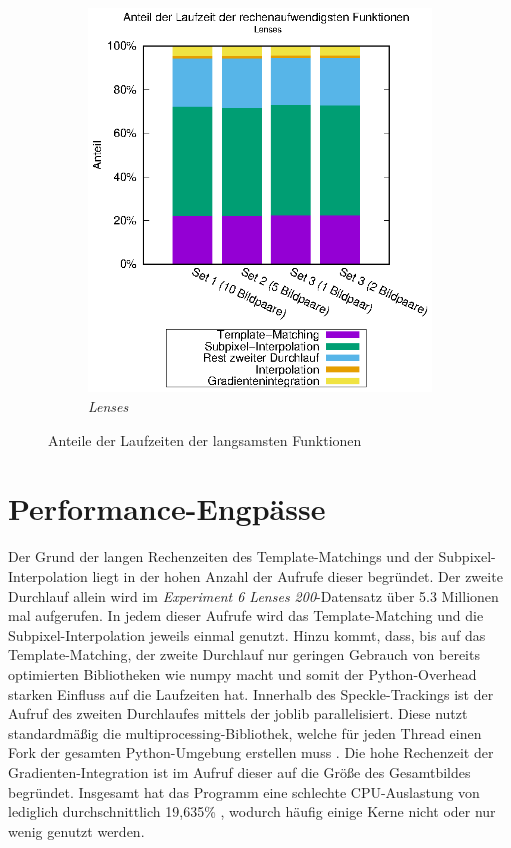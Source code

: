 \begin{center}
\begin{figure}[h!]
\begin{subfigure}[b]{0.5\textwidth}
			\includegraphics[width=\textwidth]{pdf/slow_lenses}
			\caption{\textit{Lenses}}
			\label{fig:perc_slow_lenses}
		\end{subfigure}
		\caption{Anteile der Laufzeiten der langsamsten Funktionen}
		\label{fig:perc_slow}
	\end{figure}
\end{center}

\section{Performance-Engpässe}

Der Grund der langen Rechenzeiten des Template-Matchings und der Subpixel-Interpolation liegt in der hohen Anzahl der Aufrufe dieser begründet. Der zweite Durchlauf allein wird im \textit{Experiment 6 Lenses 200}-Datensatz über 5.3 Millionen mal aufgerufen. In jedem dieser Aufrufe wird das Template-Matching und die Subpixel-Interpolation jeweils einmal genutzt. Hinzu kommt, dass, bis auf das Temp\-late-Match\-ing, der zweite Durchlauf nur geringen Gebrauch von bereits optimierten Bibliotheken wie numpy macht und somit der Python-Overhead starken Einfluss auf die Laufzeiten hat. Innerhalb des Speckle-Trackings ist der Aufruf des zweiten Durchlaufes mittels der joblib parallelisiert. Diese nutzt standardmäßig die multiprocessing-Bibliothek, welche für jeden Thread einen Fork der gesamten Python-Umgebung erstellen muss \cite{GVB+18}. Die hohe Rechenzeit der Gradienten-Integration ist im Aufruf dieser auf die Größe des Gesamtbildes begründet. Insgesamt hat das Programm eine schlechte CPU-Auslastung von lediglich durchschnittlich 19,635\% \cite{Sch18b}, wodurch häufig einige Kerne nicht oder nur wenig genutzt werden. 

